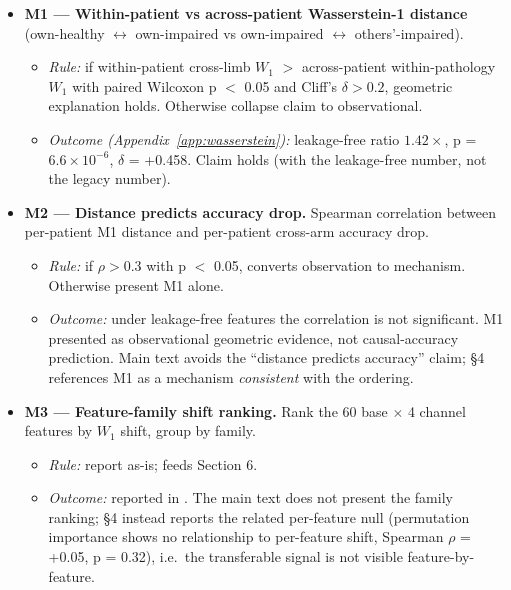 \documentclass{article}
\begin{document}
\begin{itemize}
  \item \textbf{M1 --- Within-patient vs across-patient Wasserstein-1 distance} (own-healthy $\leftrightarrow$ own-impaired vs own-impaired $\leftrightarrow$ others'-impaired).
  \begin{itemize}
    \item \emph{Rule:} if within-patient cross-limb $W_1$ $>$ across-patient within-pathology $W_1$ with paired Wilcoxon p $<$ 0.05 and Cliff's $\delta > 0.2$, geometric explanation holds. Otherwise collapse claim to observational.
    \item \emph{Outcome (Appendix~\ref{app:wasserstein}):} leakage-free ratio $1.42\times$, p = $6.6 \times 10^{-6}$, $\delta$ = +0.458. Claim holds (with the leakage-free number, not the legacy number).
  \end{itemize}
  \item \textbf{M2 --- Distance predicts accuracy drop.} Spearman correlation between per-patient M1 distance and per-patient cross-arm accuracy drop.
  \begin{itemize}
    \item \emph{Rule:} if $\rho > 0.3$ with p $<$ 0.05, converts observation to mechanism. Otherwise present M1 alone.
    \item \emph{Outcome:} under leakage-free features the correlation is not significant. M1 presented as observational geometric evidence, not causal-accuracy prediction. Main text avoids the ``distance predicts accuracy'' claim; \S 4 references M1 as a mechanism \emph{consistent} with the ordering.
  \end{itemize}
  \item \textbf{M3 --- Feature-family shift ranking.} Rank the 60 base $\times$ 4 channel features by $W_1$ shift, group by family.
  \begin{itemize}
    \item \emph{Rule:} report as-is; feeds Section 6.
    \item \emph{Outcome:} reported in . The main text does not present the family ranking; \S 4 instead reports the related per-feature null (permutation importance shows no relationship to per-feature shift, Spearman $\rho$ = +0.05, p = 0.32), i.e.\ the transferable signal is not visible feature-by-feature.
  \end{itemize}
\end{itemize}
\end{document}
